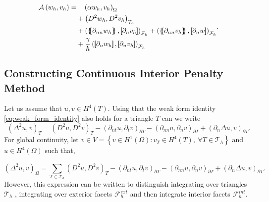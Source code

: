 \begin{equation}
\label{eq:CP_A_h}
\begin{split}
\mathcal{A} \left( w_{h}, v_{h} \right)   =&
  \quad  \left( \alpha  w_{h}, v_{h} \right) _{\Omega }\\
&  +  \left( D^2 w_{h}, D^2v_{h} \right) _{\mathcal{T} _{h}} \\
 & +
  \left( \mean{  \partial _{n n} w_{h} }, \jump{ \partial _{n }v_{h}} \right)_{\mathcal{F}_{h}}  +
 \left( \mean{ \partial _{n n} v_{h} }, \jump{ \partial _{n}w }      \right)_{\mathcal{F}_{h}}
 \\
 & + \frac{\gamma }{h}  \left( \jump{ \partial _{n} w_{h}}, \jump{ \partial _{n} v_{h}   }   \right)_{\mathcal{F}_{h}} \\
\end{split}
.
\end{equation}



\subsection{Constructing Continuous Interior Penalty Method}%
\label{sub:constructing_continious_interior_penalty_method}

 Let us assume that $u,v \in
H^{4}\left( T  \right) $. Using that the weak form identity \eqref{eq:weak_form_identity} also holds for a triangle $T$ can we write
\begin{equation}
\label{eq:bi_basic_dg}
\left( \Delta  ^{2} u,v \right) _{T} =  \left( D^2u,D^2v \right) _{T } - \left(\partial _{nt} u, \partial _{t}v
\right)_{\partial T} - \left(\partial _{nn} u, \partial _{n}v \right)_{\partial T} + \left(\partial _{n} \Delta  u,v
\right)_{\partial T}
.\end{equation}
For global continuity, let  $v \in V =  \left\{ v \in H^{1}\left( \Omega  \right): v_{T} \in  H^{4}\left( T \right), \ \forall T \in
\mathcal{T}_{h}    \right\} $ and $u \in  H^{4}\left( \Omega  \right) $ such that,

\begin{equation}
\label{eq:bi_basic_dg2}
\left( \Delta  ^{2} u,v \right) _{\Omega } = \sum_{T \in  \mathcal{T} _{h}}^{}  \left( D^2u,D^2v \right) _{T } - \left(\partial _{nt} u, \partial _{t}v
\right)_{\partial T} - \left(\partial _{nn} u, \partial _{n}v \right)_{\partial T} + \left(\partial _{n} \Delta  u,v
\right)_{\partial T}.
\end{equation}
However, this expression can be written to distinguish integrating over triangles $\mathcal{T} _{h}$ , integrating over exterior facets $\mathcal{F} _{h}^{ext}$ and then integrate interior facets $\mathcal{F} _{h}^{int}$.

